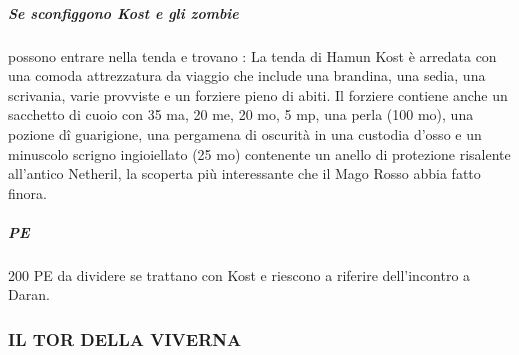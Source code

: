 \documentclass{article}
\begin{document}
\subparagraph{Se sconfiggono Kost e gli zombie} possono entrare nella tenda e trovano : La tenda di Hamun Kost è arredata con una comoda
attrezzatura da viaggio che include una brandina, una sedia,
una scrivania, varie provviste e un forziere pieno di abiti. Il
forziere contiene anche un sacchetto di cuoio con 35 ma,
20 me, 20 mo, 5 mp, una perla (100 mo), una pozione dî
guarigione, una pergamena di oscurità in una custodia d'osso
e un minuscolo scrigno ingioiellato (25 mo) contenente un
anello di protezione risalente all'antico Netheril, la scoperta
più interessante che il Mago Rosso abbia fatto finora.

\subparagraph{PE} 200 PE da dividere se trattano con Kost e riescono a riferire dell'incontro a Daran. 

\subsubsection{IL TOR DELLA VIVERNA}
\end{document}
